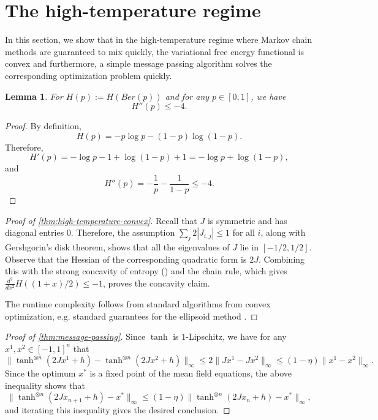 \documentclass[final, 12pt]{colt2018}
\newtheorem{lemma}[theorem]{Lemma}
\theoremstyle{definition}
\theoremstyle{plain}
\begin{document}
\section{The high-temperature regime}
In this section, we show that in the high-temperature regime
where Markov chain methods are guaranteed to mix quickly, the
variational free energy functional is convex and furthermore,
a simple message passing algorithm solves the corresponding
optimization problem quickly.
\begin{lemma}\label{lem:H-strong-concave}
For $H(p) := H(Ber(p))$ and for any $p \in [0,1]$, we have
\[ H''(p) \le -4. \]
\end{lemma}
\begin{proof}
By definition,
\[ H(p) = -p \log p - (1 - p)\log(1 - p). \]
Therefore,
\[ H'(p) = -\log p - 1 + \log(1 - p) + 1 = -\log p + \log(1 - p), \]
and
\[ H''(p) = -\frac{1}{p} - \frac{1}{1 - p} \le -4. \]
\end{proof}
\begin{proof}[Proof of \cref{thm:high-temperature-convex}]
Recall that $J$ is symmetric and has diagonal entries $0$. Therefore, the assumption $\sum_{j} 2|J_{i,j}| \leq 1$ for all $i$, along with Gershgorin's disk theorem, shows that all the eigenvalues of $J$ lie in $[-1/2, 1/2]$. 
Observe that the Hessian
of the corresponding quadratic form is $2J$. Combining
this with the strong concavity of entropy () and the chain rule, which gives $\frac{d^2}{dx^2} H((1 + x)/2) \le -1$, proves the concavity claim. 

The runtime complexity
follows from standard algorithms from convex optimization,
e.g. standard guarantees for the ellipsoid method \citep{gls}.
\end{proof}
\begin{proof}[Proof of \cref{thm:message-passing}]
Since $\tanh$ is $1$-Lipschitz, we have for any %
$x^1,x^2 \in [-1,1]^n$ that%
\[ \|\tanh^{\otimes n}(2J x^1 + h) - \tanh^{\otimes n}(2J x^2 + h)\|_{\infty}
\le 2\|J x^1 - J x^2\|_{\infty}
\le (1 - \eta) \|x^1 - x^2\|_{\infty}. \]
Since the optimum $x^*$ is a fixed point of the mean field equations, the above inequality shows that 
\[ \|\tanh^{\otimes n}(2J x_{n + 1} + h) - x^*\|_{\infty} \le (1 - \eta)\|\tanh^{\otimes n}(2J x_n + h) - x^*\|_{\infty}, \]
and iterating this inequality gives the desired conclusion.
\end{proof}
\end{document}
